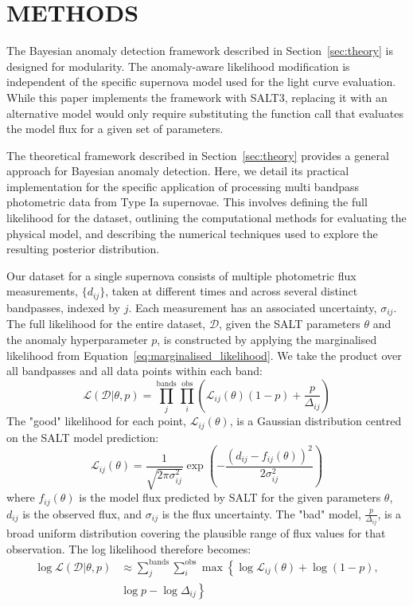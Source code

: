 \section{METHODS}
\label{sec:methods}

The Bayesian anomaly detection framework described in Section~\ref{sec:theory} is designed for modularity. The anomaly-aware likelihood modification is independent of the specific supernova model used for the light curve evaluation. While this paper implements the framework with SALT3, replacing it with an alternative model would only require substituting the function call that evaluates the model flux for a given set of parameters.

The theoretical framework described in Section~\ref{sec:theory} provides a general approach for Bayesian anomaly detection. Here, we detail its practical implementation for the specific application of processing multi bandpass photometric data from Type Ia supernovae. This involves defining the full likelihood for the dataset, outlining the computational methods for evaluating the physical model, and describing the numerical techniques used to explore the resulting posterior distribution.

Our dataset for a single supernova consists of multiple photometric flux
measurements, $\{d_{ij}\}$, taken at different times and across several distinct
bandpasses, indexed by $j$. Each measurement has an associated uncertainty,
$\sigma_{ij}$. The full likelihood for the entire dataset, $\mathcal{D}$, given
the SALT parameters $\theta$ and the anomaly hyperparameter $p$, is constructed
by applying the marginalised likelihood from Equation~\eqref{eq:marginalised_likelihood}. We take the product
over all bandpasses and all data points within each band: \begin{equation}
\mathcal{L}(\mathcal{D}|\theta, p) = \prod_{j}^{\mathrm{bands}}
\prod_{i}^{\mathrm{obs}} \left( \mathcal{L}_{ij}(\theta)(1-p)
+ \frac{p}{\Delta_{ij}} \right) \end{equation} The "good" likelihood for each point,
$\mathcal{L}_{ij}(\theta)$, is a Gaussian distribution centred on the SALT model prediction:
\begin{equation}
\mathcal{L}_{ij}(\theta) = \frac{1}{\sqrt{2\pi\sigma_{ij}^2}} \exp\left(-\frac{(d_{ij} - f_{ij}(\theta))^2}{2\sigma_{ij}^2}\right)
\end{equation}
where $f_{ij}(\theta)$ is the model flux predicted by SALT for the given parameters $\theta$, $d_{ij}$ is the observed flux, and $\sigma_{ij}$ is the flux uncertainty. The "bad" model, $\frac{p}{\Delta_{ij}}$, is a broad uniform distribution covering the plausible range of flux values for that observation. The log likelihood therefore becomes:
\begin{equation}
\begin{split}
\log \mathcal{L}(\mathcal{D}|\theta, p) &\approx \sum_{j}^{\mathrm{bands}} \sum_{i}^{\mathrm{obs}} \max \left\{ \log\mathcal{L}_{ij}(\theta) + \log(1-p), \right.\\
&\left. \log p - \log\Delta_{ij} \right\}
\end{split}
\end{equation}

